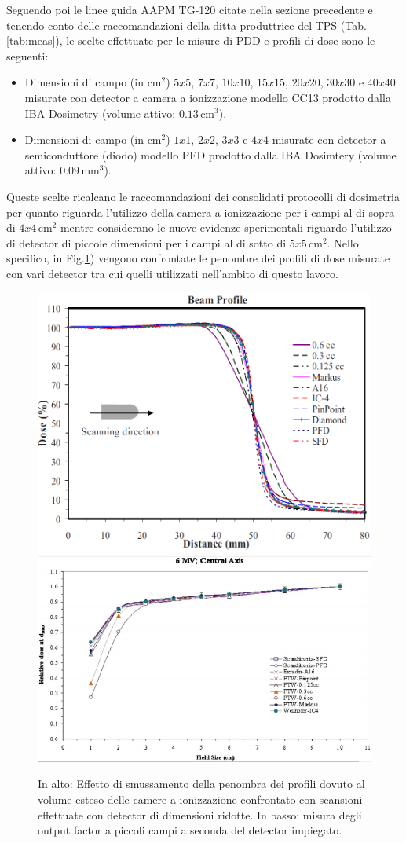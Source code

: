 Seguendo poi le linee guida AAPM TG-120 citate nella sezione precedente \cite{Low2011} e tenendo conto delle raccomandazioni della ditta produttrice del TPS (Tab.\ref{tab:meas}), le scelte effettuate per le misure di PDD e profili di dose sono le seguenti:
\begin{itemize}
\item Dimensioni di campo (in cm$^2$) $5x5$, $7x7$, $10x10$, $15x15$, $20x20$, $30x30$ e $40x40$ misurate con detector a camera a ionizzazione modello CC13 prodotto dalla IBA Dosimetry (volume attivo: $0.13\,$cm$^3$).
\item Dimensioni di campo (in cm$^2$) $1x1$, $2x2$, $3x3$ e $4x4$ misurate con detector a semiconduttore (diodo) modello PFD prodotto dalla IBA Dosimtery (volume attivo: $0.09\,$mm$^3$).
\end{itemize}
Queste scelte ricalcano le raccomandazioni dei consolidati protocolli di dosimetria per quanto riguarda l'utilizzo della camera a ionizzazione per i campi al di sopra di $4x4\,$cm$^2$ mentre considerano le nuove evidenze sperimentali \cite{Das2008a,Low2011} riguardo l'utilizzo di detector di piccole dimensioni per i campi al di sotto di $5x5\,$cm$^2$. Nello specifico, in Fig.\ref{fig:pen_of}) vengono confrontate le penombre dei profili di dose misurate con vari detector tra cui quelli utilizzati nell'ambito di questo lavoro.
\begin{figure}[!t]
\centering
\includegraphics[width=.75\textwidth]{./cap2/pen_smear.png}\\
\includegraphics[width=.75\textwidth]{./cap2/OF_uncert.png}
\caption{In alto: Effetto di smussamento della penombra dei profili dovuto al volume esteso delle camere a ionizzazione confrontato con scansioni effettuate con detector di dimensioni ridotte\cite{Das2008a}. In basso: misura degli output factor a piccoli campi a seconda del detector impiegato\cite{Das2008}.}
\label{fig:pen_of}
\end{figure}
